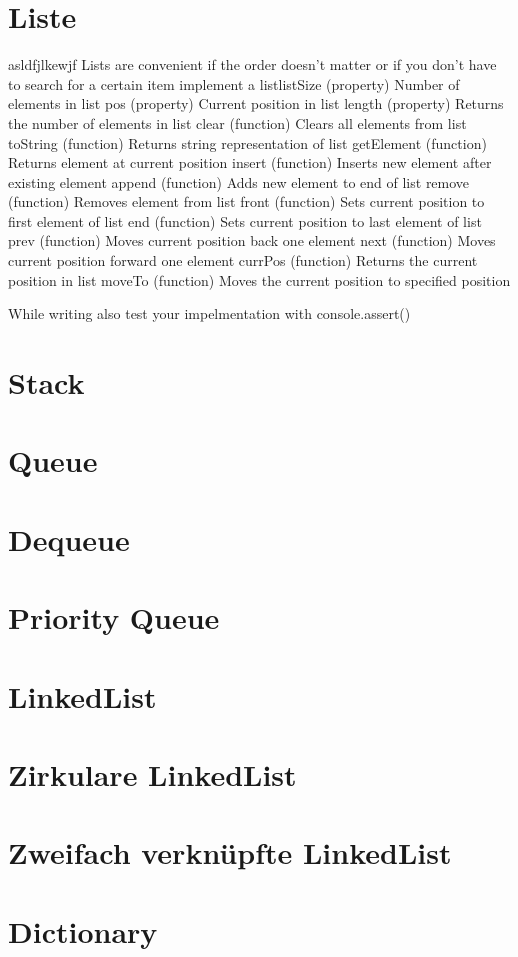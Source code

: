 \documentclass{book}
\begin{document}
\section{Liste}
asldfjlkewjf
Lists are convenient if the order doesn't matter or if you don't have to search for a certain item
implement a listlistSize (property) Number of elements in list
pos (property) Current position in list
length (property) Returns the number of elements in list
clear (function) Clears all elements from list
toString (function) Returns string representation of list
getElement (function) Returns element at current position
insert (function) Inserts new element after existing element
append (function) Adds new element to end of list
remove (function) Removes element from list
front (function) Sets current position to first element of list
end (function) Sets current position to last element of list
prev (function) Moves current position back one element
next (function) Moves current position forward one element
currPos (function) Returns the current position in list
moveTo (function) Moves the current position to specified position

While writing also test your impelmentation with console.assert()
\section{Stack}
\section{Queue}
\section{Dequeue}
\section{Priority Queue}
\section{LinkedList}
\section{Zirkulare LinkedList}
\section{Zweifach verknüpfte LinkedList}
\section{Dictionary}
\end{document}
